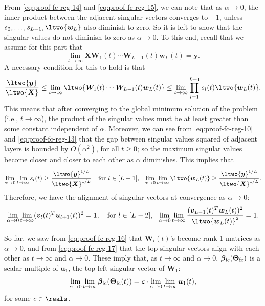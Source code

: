 \documentclass{article} %
\def\vu{{\bm{u}}}
\def\vv{{\bm{v}}}
\def\vw{{\bm{w}}}
\def\vy{{\bm{y}}}
\def\mW{{\bm{W}}}
\def\mX{{\bm{X}}}
\newcommand{\vbeta}{{\bm{\beta}}}
\newcommand{\vbetafc}{\vbeta_{\rm fc}}
\newcommand{\bTheta}{\bm{\Theta}}
\newcommand{\bThetafc}{\bTheta_{\rm fc}}
\begin{document}
From \eqref{eq:proof-fc-reg-14} and \eqref{eq:proof-fc-reg-15}, we can note that as $\alpha \to 0$, the inner product between the adjacent singular vectors converges to $\pm 1$, unless $s_{2}, \dots, s_{L-1}, \ltwo{\vw_L}$ also diminish to zero. So it is left to show that the singular values do not diminish to zero as $\alpha \to 0$.
To this end, recall that we assume for this part that
\begin{equation*}
 \lim_{t \to \infty} \mX \mW_1(t) \cdots \mW_{L-1}(t) \vw_L(t) = \vy.   
\end{equation*}
A necessary condition for this to hold is that 
\begin{equation*}
    \frac{\ltwo{\vy}}{\ltwo{\mX}} \leq \lim_{t \to \infty} \ltwo{\mW_1(t) \cdots \mW_{L-1}(t)\vw_L(t)} \leq \lim_{t \to \infty} \prod_{l=1}^{L-1} s_l(t) \ltwo{\vw_L(t)}.
\end{equation*}
This means that after converging to the global minimum solution of the problem (i.e., $t \to \infty$), the product of the singular values must be at least greater than some constant independent of $\alpha$. Moreover, we can see from \eqref{eq:proof-fc-reg-10} and \eqref{eq:proof-fc-reg-13} that the gap between singular values squared of adjacent layers is bounded by $O(\alpha^2)$, for all $t \geq 0$; so the maximum singular values become closer and closer to each other as $\alpha$ diminishes. 
This implies that 
\begin{equation*}
    \lim_{\alpha \to 0} \lim_{t \to \infty} s_l(t) \geq \frac{\ltwo{\vy}^{1/L}}{\ltwo{\mX}^{1/L}}~~\text{ for } l \in [L-1],~~
    \lim_{\alpha \to 0} \lim_{t \to \infty} \ltwo{\vw_L(t)} \geq \frac{\ltwo{\vy}^{1/L}}{\ltwo{\mX}^{1/L}}.
\end{equation*}
Therefore, we have the alignment of singular vectors at convergence as $\alpha \to 0$:
\begin{equation}
\label{eq:proof-fc-reg-17}
    \lim_{\alpha \to 0} \lim_{t \to \infty} (\vv_l(t)^T \vu_{l+1}(t))^2 = 1,~~\text{ for } l \in [L-2],~~
    \lim_{\alpha \to 0} \lim_{t \to \infty} \frac{(\vv_{L-1}(t)^T \vw_L(t))^2}{\ltwo{\vw_L(t)}^2} = 1.
\end{equation}

So far, we saw from \eqref{eq:proof-fc-reg-16} that $\mW_l(t)$'s become rank-1 matrices as $\alpha \to 0$, and from \eqref{eq:proof-fc-reg-17} that the top singular vectors align with each other as $t \to \infty$ and $\alpha \to 0$. These imply that, as $t \to \infty$ and $\alpha \to 0$, $\vbetafc(\bThetafc)$ is a scalar multiple of $\vu_1$, the top left singular vector of $\mW_1$:
\begin{equation}
\label{eq:proof-fc-reg-18}
    \lim_{\alpha \to 0} \lim_{t \to \infty} \vbetafc(\bThetafc(t))
    = c \cdot \lim_{\alpha \to 0} \lim_{t \to \infty} \vu_1(t),
\end{equation}
for some $c \in \reals$.
\end{document}
